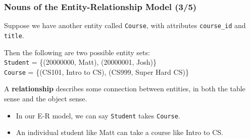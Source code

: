\begin{frame}
\frametitle{Nouns of the Entity-Relationship Model (3/5)}

Suppose we have another entity called \texttt{Course}, with attributes \texttt{course\_id} and \texttt{title}.

Then the following are two possible entity sets:\\
\texttt{Student} = \{(20000000, Matt), (20000001, Josh)\}\\
\texttt{Course} = \{(CS101, Intro to CS), (CS999, Super Hard CS)\}

A \textbf{relationship} describes some connection between entities, in both the table sense and the object sense.\\
\begin{itemize}
  \item In our E-R model, we can say \texttt{Student} takes \texttt{Course}.
  \item An individual student like Matt can take a course like Intro to CS.
\end{itemize}
\end{frame}


